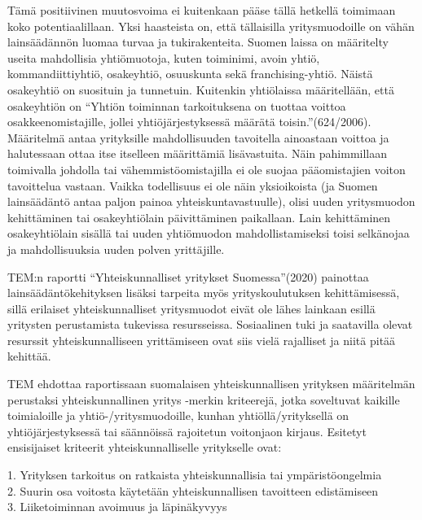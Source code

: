 \documentclass[nobib,finnish,oneside,openany,notoc,a4paper]{tufte-book}
\begin{document}
Tämä positiivinen muutosvoima ei kuitenkaan pääse tällä hetkellä
toimimaan koko potentiaalillaan. Yksi haasteista on, että tällaisilla
yritysmuodoille on vähän lainsäädännön luomaa turvaa ja tukirakenteita.
Suomen laissa on määritelty useita mahdollisia yhtiömuotoja, kuten
toiminimi, avoin yhtiö, kommandiittiyhtiö, osakeyhtiö, osuuskunta sekä
franchising-yhtiö. Näistä osakeyhtiö on suosituin ja tunnetuin.
Kuitenkin yhtiölaissa määritellään, että osakeyhtiön on ``Yhtiön
toiminnan tarkoituksena on tuottaa voittoa osakkeenomistajille, jollei
yhtiöjärjestyksessä määrätä toisin.''(624/2006). Määritelmä antaa
yrityksille mahdollisuuden tavoitella ainoastaan voittoa ja halutessaan
ottaa itse itselleen määrittämiä lisävastuita. Näin pahimmillaan
toimivalla johdolla tai vähemmistöomistajilla ei ole suojaa
pääomistajien voiton tavoittelua vastaan. Vaikka todellisuus ei ole näin
yksioikoista (ja Suomen lainsäädäntö antaa paljon painoa
yhteiskuntavastuulle), olisi uuden yritysmuodon kehittäminen tai
osakeyhtiölain päivittäminen paikallaan. Lain kehittäminen
osakeyhtiölain sisällä tai uuden yhtiömuodon mahdollistamiseksi toisi
selkänojaa ja mahdollisuuksia uuden polven yrittäjille.

TEM:n raportti ``Yhteiskunnalliset yritykset Suomessa''(2020) painottaa
lainsäädäntökehityksen lisäksi tarpeita myös yrityskoulutuksen
kehittämisessä, sillä erilaiset yhteiskunnalliset yritysmuodot eivät ole
lähes lainkaan esillä yritysten perustamista tukevissa resursseissa.
Sosiaalinen tuki ja saatavilla olevat resurssit yhteiskunnalliseen
yrittämiseen ovat siis vielä rajalliset ja niitä pitää kehittää.

TEM ehdottaa raportissaan suomalaisen yhteiskunnallisen yrityksen
määritelmän perustaksi yhteiskunnallinen yritys -merkin kriteerejä,
jotka soveltuvat kaikille toimialoille ja yhtiö-/yritysmuodoille, kunhan
yhtiöllä/yrityksellä on yhtiöjärjestyksessä tai säännöissä rajoitetun
voitonjaon kirjaus. Esitetyt ensisijaiset kriteerit yhteiskunnalliselle
yritykselle ovat:

1. Yrityksen tarkoitus on ratkaista yhteiskunnallisia tai
ympäristöongelmia\\
2. Suurin osa voitosta käytetään yhteiskunnallisen tavoitteen
edistämiseen\\
3. Liiketoiminnan avoimuus ja läpinäkyvyys
\end{document}
